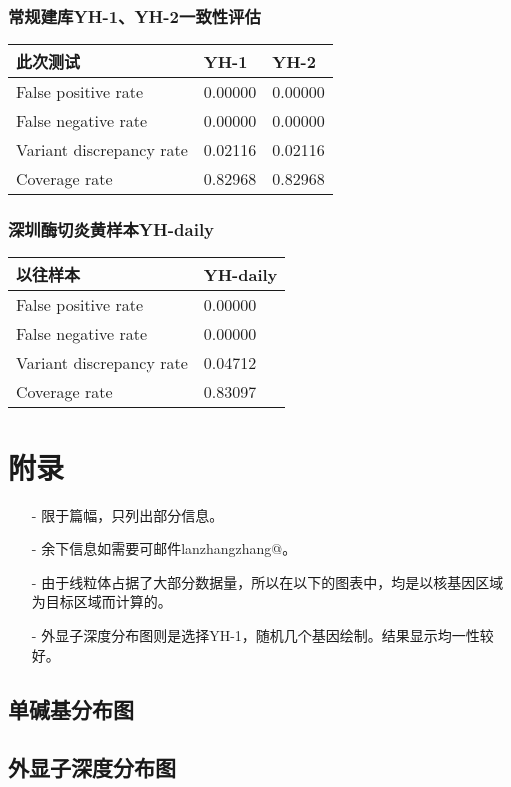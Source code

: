 \documentclass[a4paper,11pt]{article}
\theoremstyle{mytheor}
\begin{document}
\begin{CJK*}{UTF8}{gbsn}
\subsubsection{常规建库YH-1、YH-2一致性评估}
\begin{center}
\begin{tabular}[t]{l|l|l}
\hline
此次测试	&	YH-1	&	YH-2	\\
\hline
		False positive rate	&	0.00000	&	0.00000	 \\
		False negative rate	&	0.00000	&	0.00000	 \\
		Variant discrepancy rate & 0.02116 & 0.02116 \\ 
		Coverage rate 	&	0.82968 	&	0.82968	\\
\hline
\end{tabular}
\end{center}
\subsubsection{深圳酶切炎黄样本YH-daily}
\begin{center}
\begin{tabular}[t]{l|l}
\hline
以往样本	&	YH-daily	\\
\hline
		False positive rate	&	0.00000		 \\
		False negative rate	&	0.00000		 \\
		Variant discrepancy rate & 0.04712  \\ 
		Coverage rate 	&	0.83097	\\
\hline
\end{tabular}
\end{center}

\section{附录}
\fontsize{10}{12} \selectfont
\begin{itemize}\setlength{\itemsep}{0pt}
\item[-] 限于篇幅，只列出部分信息。
\item[-] 余下信息如需要可邮件lanzhangzhang@。
\item[-] 由于线粒体占据了大部分数据量，所以在以下的图表中，均是以核基因区域为目标区域而计算的。
\item[-] 外显子深度分布图则是选择YH-1，随机几个基因绘制。结果显示均一性较好。
\end{itemize}
\subsection{单碱基分布图}


\subsection{外显子深度分布图}



\end{CJK*}
\end{document}
